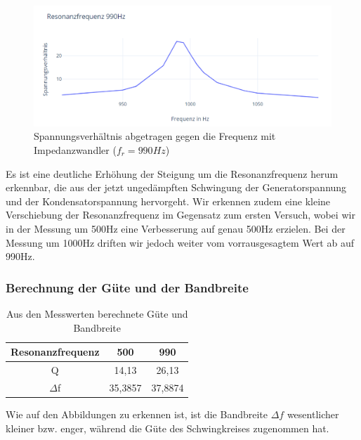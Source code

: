 \documentclass{article}
\begin{document}
\begin{figure}[h!]
  \begin{center}
    \includegraphics[scale=0.75]{../assets/images/ETP3/Fre990Plot5.PNG}
    \caption{Spannungsverhältnis abgetragen gegen die Frequenz mit Impedanzwandler ($f_r = 990Hz$)}
  \end{center}
\end{figure}
Es ist eine deutliche Erhöhung der Steigung um die Resonanzfrequenz herum erkennbar, die aus der jetzt ungedämpften Schwingung
der Generatorspannung und der Kondensatorspannung hervorgeht. Wir erkennen zudem eine kleine Verschiebung der Resonanzfrequenz im Gegensatz zum ersten Versuch,
wobei wir in der Messung um 500Hz eine Verbesserung auf genau 500Hz erzielen. Bei der Messung um 1000Hz driften wir jedoch weiter vom vorrausgesagtem Wert ab auf 990Hz.

\newpage

\subsubsection{Berechnung der Güte und der Bandbreite}

\begin{table}[h!]
  \begin{center}
    \begin{tabular}{|c|c|c|}
      \hline
      Resonanzfrequenz & 500     & 990     \\
      \hline
      Q                & 14,13   & 26,13   \\
      \hline
      $\Delta$f        & 35,3857 & 37,8874 \\
      \hline
    \end{tabular}
    \caption{Aus den Messwerten berechnete Güte und Bandbreite}
    \label{tab:zMGB}
  \end{center}
\end{table}

Wie auf den Abbildungen zu erkennen ist, ist die Bandbreite $\Delta f$ wesentlicher kleiner bzw. enger, während die Güte des
Schwingkreises zugenommen hat.
\end{document}
